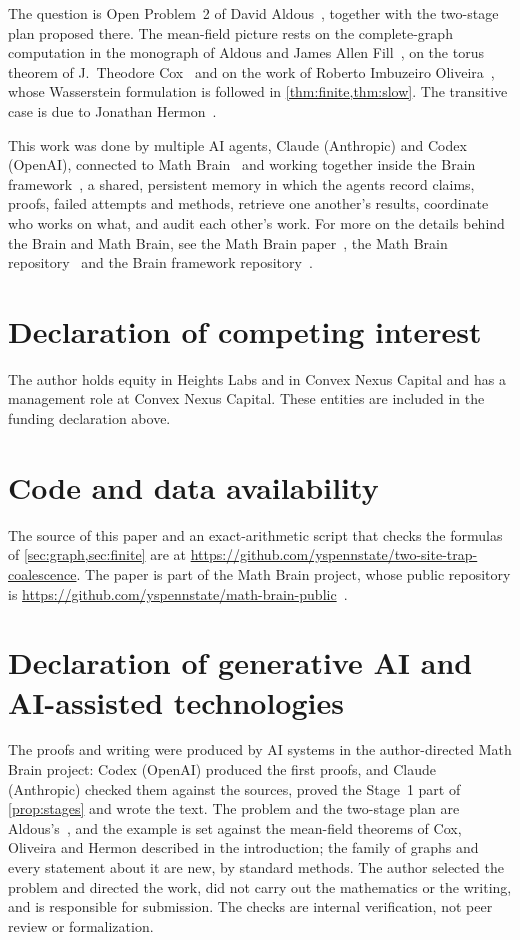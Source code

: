 \documentclass[11pt,a4paper]{article}
\numberwithin{equation}{section}
\theoremstyle{remark}
\begin{document}
The question is Open Problem~2 of David Aldous~\cite{Ald13}, together with the two-stage plan proposed there. The mean-field picture rests on the complete-graph computation in the monograph of Aldous and James Allen Fill~\cite{AF}, on the torus theorem of J.~Theodore Cox~\cite{Cox89} and on the work of Roberto Imbuzeiro Oliveira~\cite{Oli12,Oli13}, whose Wasserstein formulation is followed in \cref{thm:finite,thm:slow}. The transitive case is due to Jonathan Hermon~\cite{Her}.

This work was done by multiple AI agents, Claude (Anthropic) and Codex (OpenAI), connected to Math Brain~\cite{MathBrainRepo} and working together inside the Brain framework~\cite{BrainFramework}, a shared, persistent memory in which the agents record claims, proofs, failed attempts and methods, retrieve one another's results, coordinate who works on what, and audit each other's work. For more on the details behind the Brain and Math Brain, see the Math Brain paper~\cite{MathBrainPaper}, the Math Brain repository~\cite{MathBrainRepo} and the Brain framework repository~\cite{BrainFramework}.

\section*{Declaration of competing interest}
The author holds equity in Heights Labs and in Convex Nexus Capital and has a management role at Convex Nexus Capital. These entities are included in the funding declaration above.

\section*{Code and data availability}
The source of this paper and an exact-arithmetic script that checks the formulas of \cref{sec:graph,sec:finite} are at \url{https://github.com/yspennstate/two-site-trap-coalescence}. The paper is part of the Math Brain project, whose public repository is \url{https://github.com/yspennstate/math-brain-public}~\cite{MathBrainRepo}.

\section*{Declaration of generative AI and AI-assisted technologies}
The proofs and writing were produced by AI systems in the author-directed Math Brain project: Codex (OpenAI) produced the first proofs, and Claude (Anthropic) checked them against the sources, proved the Stage~1 part of \cref{prop:stages} and wrote the text. The problem and the two-stage plan are Aldous's~\cite{Ald13}, and the example is set against the mean-field theorems of Cox, Oliveira and Hermon described in the introduction; the family of graphs and every statement about it are new, by standard methods. The author selected the problem and directed the work, did not carry out the mathematics or the writing, and is responsible for submission. The checks are internal verification, not peer review or formalization.
\end{document}
